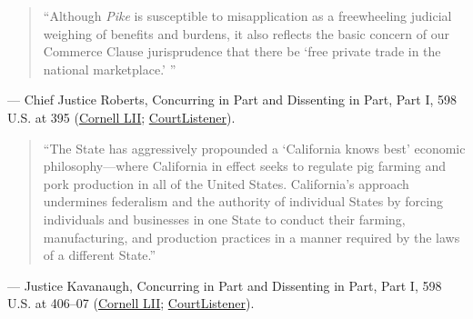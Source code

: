 \documentclass[12pt]{article}
\begin{document}
\begin{quote}
``Although \textit{Pike} is susceptible to misapplication as a freewheeling judicial weighing of benefits and burdens, it also reflects the basic concern of our Commerce Clause jurisprudence that there be `free private trade in the national marketplace.' ''
\end{quote}
\noindent --- Chief Justice Roberts, Concurring in Part and Dissenting in Part, Part I, 598 U.S. at 395 (\href{https://www.law.cornell.edu/supremecourt/text/21-468}{Cornell LII}; \href{https://www.courtlistener.com/opinion/10049695/national-pork-producers-council-v-ross/}{CourtListener}).

\begin{quote}
``The State has aggressively propounded a `California knows best' economic philosophy---where California in effect seeks to regulate pig farming and pork production in all of the United States. California's approach undermines federalism and the authority of individual States by forcing individuals and businesses in one State to conduct their farming, manufacturing, and production practices in a manner required by the laws of a different State.''
\end{quote}
\noindent --- Justice Kavanaugh, Concurring in Part and Dissenting in Part, Part I, 598 U.S. at 406--07 (\href{https://www.law.cornell.edu/supremecourt/text/21-468}{Cornell LII}; \href{https://www.courtlistener.com/opinion/10049695/national-pork-producers-council-v-ross/}{CourtListener}).
\end{document}
